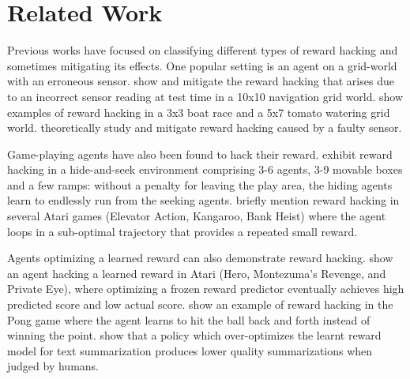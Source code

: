 \section{Related Work}\label{sec:related}
Previous works have focused on classifying different types of reward hacking and sometimes mitigating its effects. One popular setting is an agent on a grid-world with an erroneous sensor. \citet{hadfield2017ird} show and mitigate the reward hacking that arises due to an incorrect sensor reading at test time in a 10x10 navigation grid world. \citet{leike2017gridworld} show examples of reward hacking in a 3x3 boat race and a 5x7 tomato watering grid world. \citet{everitt2017corruptedreward} theoretically study and mitigate reward hacking caused by a faulty sensor.  

Game-playing agents have also been found to hack their reward. \citet{baker2020emergent} exhibit reward hacking in a hide-and-seek environment comprising 3-6 agents, 3-9 movable boxes and a few ramps: without a penalty for leaving the play area, the hiding agents learn to endlessly run from the seeking agents. \citet{toromanoff2019drl} briefly mention reward hacking in several Atari games (Elevator Action, Kangaroo, Bank Heist) where the agent loops in a sub-optimal trajectory that provides a repeated small reward. 

Agents optimizing a learned reward can also demonstrate reward hacking. \citet{ibarz2018humandemo} show an agent hacking a learned reward in Atari (Hero, Montezuma's Revenge, and Private Eye), where optimizing a frozen reward predictor eventually achieves high predicted score and low actual score. \citet{christiano2017preflearning} show an example of reward hacking in the Pong game where the agent learns to hit the ball back and forth instead of winning the point. \citet{stiennon2020learning} show that a policy which over-optimizes the learnt reward model for text summarization produces lower quality summarizations when judged by humans. 

